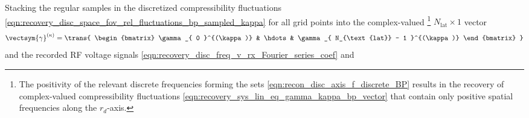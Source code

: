 Stacking
the regular samples in
the discretized compressibility fluctuations
\eqref{eqn:recovery_disc_space_fov_rel_fluctuations_bp_sampled_kappa} for
all grid points into
the complex-valued%
\footnote{
  The positivity of
  the relevant discrete frequencies forming
  the sets
  \eqref{eqn:recon_disc_axis_f_discrete_BP} results in
  the recovery of
  complex-valued compressibility fluctuations
  \eqref{eqn:recovery_sys_lin_eq_gamma_kappa_bp_vector} that contain only
  positive spatial frequencies along
  the $r_{d}$-axis.
}
$N_{\text{lat}} \times 1$ vector
\begin{equation}
  \vectsym{\gamma}^{(\kappa)}
  =
  \trans{
    \begin{bmatrix}
      \gamma_{ 0 }^{(\kappa)} & \hdots & \gamma_{ N_{\text{lat}} - 1 }^{(\kappa)}
    \end{bmatrix}
  }
 \label{eqn:recovery_sys_lin_eq_gamma_kappa_bp_vector}
\end{equation}
and
the recorded \ac{RF} voltage signals
\eqref{eqn:recovery_disc_freq_v_rx_Fourier_series_coef} and
